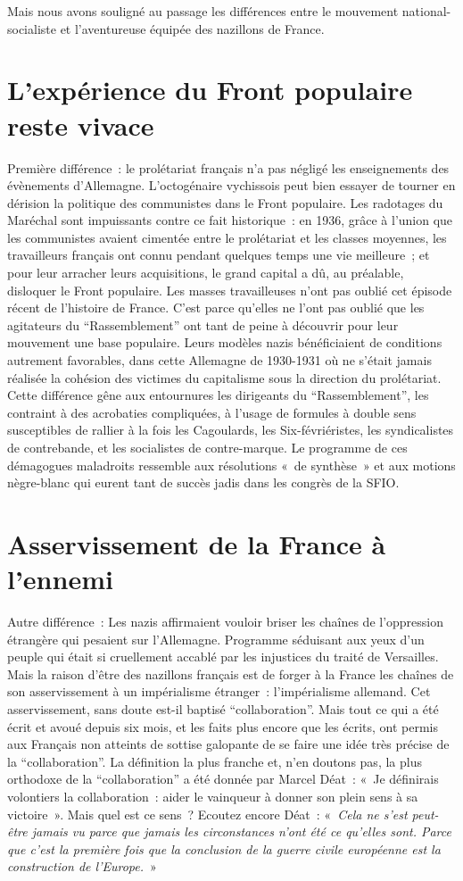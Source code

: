 \documentclass[french,twoside]{book} %
\begin{document}
Mais nous avons souligné au passage les différences entre le mouvement national-socialiste et l’aventureuse équipée des nazillons de France.\par
\section[{L’expérience du Front populaire reste vivace}]{L’expérience du Front populaire reste vivace}
\noindent Première différence : le prolétariat français n’a pas négligé les enseignements des évènements d’Allemagne. L’octogénaire vychissois peut bien essayer de tourner en dérision la politique des communistes dans le Front populaire. Les radotages du Maréchal sont impuissants contre ce fait historique : en 1936, grâce à l’union que les communistes avaient cimentée entre le prolétariat et les classes moyennes, les travailleurs français ont connu pendant quelques temps une vie meilleure ; et pour leur arracher leurs acquisitions, le grand capital a dû, au préalable, disloquer le Front populaire. Les masses travailleuses n’ont pas oublié cet épisode récent de l’histoire de France. C’est parce qu’elles ne l’ont pas oublié que les agitateurs du “Rassemblement” ont tant de peine à découvrir pour leur mouvement une base populaire. Leurs modèles nazis bénéficiaient de conditions autrement favorables, dans cette Allemagne de 1930-1931 où ne s’était jamais réalisée la cohésion des victimes du capitalisme sous la direction du prolétariat. Cette différence gêne aux entournures les dirigeants du “Rassemblement”, les contraint à des acrobaties compliquées, à l’usage de formules à double sens susceptibles de rallier à la fois les Cagoulards, les Six-févriéristes, les syndicalistes de contrebande, et les socialistes de contre-marque. Le programme de ces démagogues maladroits ressemble aux résolutions « de synthèse » et aux motions nègre-blanc qui eurent tant de succès jadis dans les congrès de la SFIO.
\section[{Asservissement de la France à l’ennemi}]{Asservissement de la France à l’ennemi}
\noindent Autre différence : Les nazis affirmaient vouloir briser les chaînes de l’oppression étrangère qui pesaient sur l’Allemagne. Programme séduisant aux yeux d’un peuple qui était si cruellement accablé par les injustices du traité de Versailles. Mais la raison d’être des nazillons français est de forger à la France les chaînes de son asservissement à un impérialisme étranger : l’impérialisme allemand. Cet asservissement, sans doute est-il baptisé “collaboration”. Mais tout ce qui a été écrit et avoué depuis six mois, et les faits plus encore que les écrits, ont permis aux Français non atteints de sottise galopante de se faire une idée très précise de la “collaboration”. La définition la plus franche et, n’en doutons pas, la plus orthodoxe de la “collaboration” a été donnée par Marcel Déat : « Je définirais volontiers la collaboration : aider le vainqueur à donner son plein sens à sa victoire ». Mais quel est ce sens ? Ecoutez encore Déat : « \emph{Cela ne s’est peut-être jamais vu parce que jamais les circonstances n’ont été ce qu’elles sont. Parce que c’est la première fois que la conclusion de la guerre civile européenne est la construction de l’Europe.} »
\end{document}
